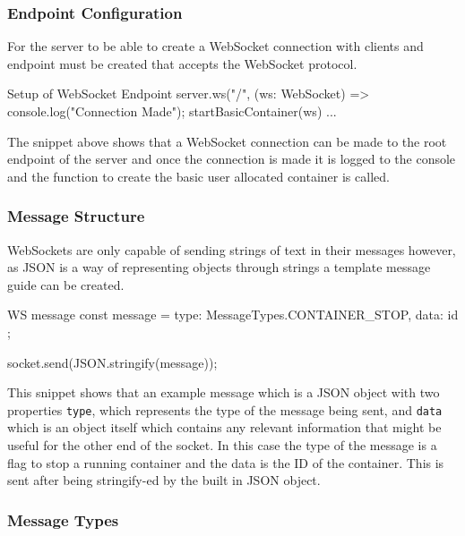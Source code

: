 \subsubsection{Endpoint Configuration} \label{impl-ws-config}

For the server to be able to create a WebSocket connection with clients and endpoint must be created that accepts the WebSocket protocol. 

\begin{sexylisting}{Setup of WebSocket Endpoint}
    server.ws("/", (ws: WebSocket) => {
        console.log("Connection Made");
        startBasicContainer(ws)
        {...}
    }
\end{sexylisting}

The snippet above shows that a WebSocket connection can be made to the root endpoint of the server and once the connection is made it is logged to the console and the function to create the basic user allocated container is called.

\subsubsection{Message Structure} \label{impl-ws-msg-struct}

WebSockets are only capable of sending strings of text in their messages however, as JSON is a way of representing objects through strings a template message guide can be created.

\begin{sexylisting}[label={code:ws-msg}]{WS message}
    const message = {
        type: MessageTypes.CONTAINER_STOP,
        data: { id }
    };

    socket.send(JSON.stringify(message));
\end{sexylisting}

This snippet shows that an example message which is a JSON object with two properties \texttt{type}, which represents the type of the message being sent, and \texttt{data} which is an object itself which contains any relevant information that might be useful for the other end of the socket. In this case the type of the message is a flag to stop a running container and the data is the ID of the container. This is sent after being stringify-ed by the built in JSON object.

\subsubsection{Message Types} \label{impl-ws-msg-type}


